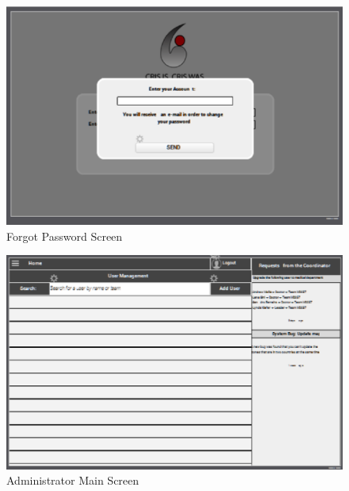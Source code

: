 \begin{figure}[htbp]
\begin{center}
 \caption{\label{fig:W1} Forgot Password Screen}
   \includegraphics[width=150mm]{./images/Web/forgot.eps}
\end{center}
\end{figure}
\begin{figure}[htbp]
\begin{center}
 \caption{\label{fig:W20} Administrator Main Screen}
   \includegraphics[width=150mm]{./images/Web/aadminmainscreen.eps}
\end{center}
\end{figure}
